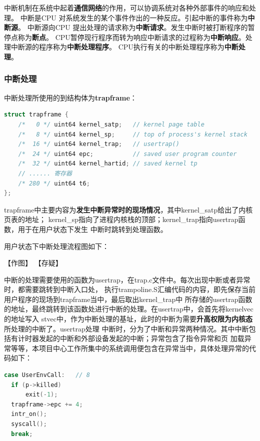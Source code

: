 \documentclass[UTF8,a4paper,10pt]{ctexart}
\begin{document}
中断机制在系统中起着\textbf{通信网络}的作用，可以协调系统对各种外部事件的响应和处理。
中断是CPU 对系统发生的某个事件作出的一种反应。引起中断的事件称为\textbf{中断源}。
中断源向CPU 提出处理的请求称为\textbf{中断请求}。发生中断时被打断程序的暂停点称为\textbf{断点}。
CPU暂停现行程序而转为响应中断请求的过程称为\textbf{中断响应}。处理中断源的程序称为\textbf{中断处理程序}。
CPU执行有关的中断处理程序称为\textbf{中断处理}。

\subsubsection{中断处理}

中断处理所使用的到结构体为\textbf{trapframe}：

\begin{lstlisting}[title=trapframe结构体,frame=trbl,language={C}]
  struct trapframe {
    /*   0 */ uint64 kernel_satp;   // kernel page table
    /*   8 */ uint64 kernel_sp;     // top of process's kernel stack
    /*  16 */ uint64 kernel_trap;   // usertrap()
    /*  24 */ uint64 epc;           // saved user program counter
    /*  32 */ uint64 kernel_hartid; // saved kernel tp
    // ...... 寄存器
    /* 280 */ uint64 t6;
};
  \end{lstlisting}

trapframe中主要内容为\textbf{发生中断异常时的现场情况}，其中kernel\_satp给出了内核页表的地址；
kernel\_sp指向了进程内核栈的顶部；kernel\_trap指向usertrap函数，用于在用户状态下发生
中断时跳转到处理函数。

用户状态下中断处理流程图如下：

【作图】
【存疑】

中断的处理需要使用的函数为usertrap，在trap.c文件中。每次出现中断或者异常时，都需要跳转到中断入口处，
执行trampoline.S汇编代码的内容，即先保存当前用户程序的现场到trapframe当中，最后取出kernel\_trap中
所存储的usertrap函数的地址，最终跳转到该函数处进行中断的处理。在usertrap中，会首先将kernelvec的地址写入
stvec中，作为中断处理的基址，此时的中断为需要\textbf{升高权限为内核态}所处理的中断了。usertrap处理
中断时，分为了中断和异常两种情况。其中中断包括有计时器发起的中断和外部设备发起的中断；异常包含了指令异常和页
加载异常等等，本项目中心工作所集中的系统调用便包含在异常当中，具体处理异常的代码如下：

\begin{lstlisting}[title=系统调用异常,frame=trbl,language={C}]
  case UserEnvCall:   // 8
  if (p->killed)
      exit(-1);
  trapframe->epc += 4;
  intr_on();
  syscall();
  break;
  \end{lstlisting}
\end{document}
